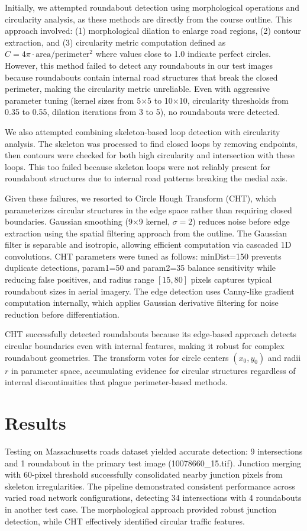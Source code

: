 \documentclass[conference]{IEEEtran}
\begin{document}
Initially, we attempted roundabout detection using morphological operations and circularity analysis, as these methods are directly from the course outline. This approach involved: (1) morphological dilation to enlarge road regions, (2) contour extraction, and (3) circularity metric computation defined as $C = 4\pi \cdot \text{area}/\text{perimeter}^2$ where values close to 1.0 indicate perfect circles. However, this method failed to detect any roundabouts in our test images because roundabouts contain internal road structures that break the closed perimeter, making the circularity metric unreliable. Even with aggressive parameter tuning (kernel sizes from 5$\times$5 to 10$\times$10, circularity thresholds from 0.35 to 0.55, dilation iterations from 3 to 5), no roundabouts were detected.

We also attempted combining skeleton-based loop detection with circularity analysis. The skeleton was processed to find closed loops by removing endpoints, then contours were checked for both high circularity and intersection with these loops. This too failed because skeleton loops were not reliably present for roundabout structures due to internal road patterns breaking the medial axis.

Given these failures, we resorted to Circle Hough Transform (CHT), which parameterizes circular structures in the edge space rather than requiring closed boundaries. Gaussian smoothing (9$\times$9 kernel, $\sigma=2$) reduces noise before edge extraction using the spatial filtering approach from the outline. The Gaussian filter is separable and isotropic, allowing efficient computation via cascaded 1D convolutions. CHT parameters were tuned as follows: minDist=150 prevents duplicate detections, param1=50 and param2=35 balance sensitivity while reducing false positives, and radius range $[15, 80]$ pixels captures typical roundabout sizes in aerial imagery. The edge detection uses Canny-like gradient computation internally, which applies Gaussian derivative filtering for noise reduction before differentiation.

CHT successfully detected roundabouts because its edge-based approach detects circular boundaries even with internal features, making it robust for complex roundabout geometries. The transform votes for circle centers $(x_0, y_0)$ and radii $r$ in parameter space, accumulating evidence for circular structures regardless of internal discontinuities that plague perimeter-based methods.

\section{Results}

Testing on Massachusetts roads dataset yielded accurate detection: 9 intersections and 1 roundabout in the primary test image (10078660\_15.tif). Junction merging with 60-pixel threshold successfully consolidated nearby junction pixels from skeleton irregularities. The pipeline demonstrated consistent performance across varied road network configurations, detecting 34 intersections with 4 roundabouts in another test case. The morphological approach provided robust junction detection, while CHT effectively identified circular traffic features.
\end{document}
